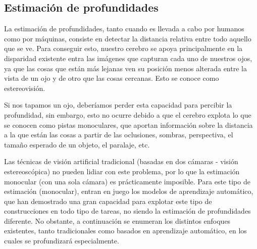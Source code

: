 \documentclass[a4paper]{article}
\begin{document}



\subsection{Estimación de profundidades}
La estimación de profundidades, tanto cuando es llevada a cabo por humanos como por máquinas, consiste en detectar la distancia relativa entre todo aquello que se ve. Para conseguir esto, nuestro cerebro se apoya principalmente en la disparidad existente entra las imágenes que capturan cada uno de nuestros ojos, ya que las cosas que están más lejanas ven su posición menos alterada entre la vista de un ojo y de otro que las cosas cercanas. Esto se conoce como estereovisión.

Si nos tapamos un ojo, deberíamos perder esta capacidad para percibir la profundidad, sin embargo, esto no ocurre debido a que el cerebro explota lo que se conocen como pistas monoculares, que aportan información sobre la distancia a la que están las cosas a partir de las oclusiones, sombras, perspectiva, el tamaño esperado de un objeto, el paralaje, etc.

Las técnicas de visión artificial tradicional (basadas en dos cámaras - visión estereoscópica) no pueden lidiar con este problema, por lo que la estimación monocular (con una sola cámara) es prácticamente imposible. Para este tipo de estimación (monocular), entran en juego los modelos de aprendizaje automático, que han demostrado una gran capacidad para explotar este tipo de construcciones en todo tipo de tareas, no siendo la estimación de profundidades diferente. No obstante, a continuación se enumeran los distintos enfoques existentes, tanto tradicionales como basados en aprendizaje automático, en los cuales se profundizará especialmente.

\end{document}
